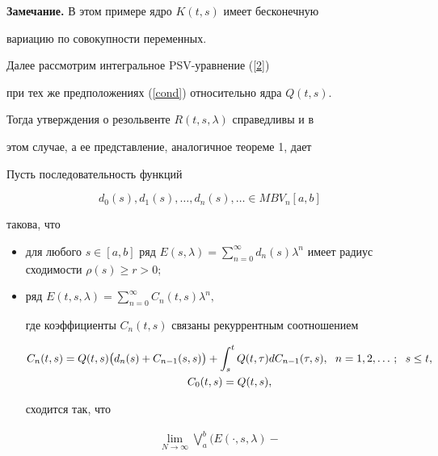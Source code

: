 {\bf Замечание.} В этом примере ядро $K(t,s)$ имеет бесконечную


вариацию по совокупности переменных.


\medskip





Далее рассмотрим интегральное PSV-уравнение (\ref{2})


при тех же предположениях (\ref{cond}) относительно ядра $Q(t,s).$


Тогда утверждения о резольвенте $R(t,s,\lambda)$ справедливы и в


этом случае, а ее представление, аналогичное теореме 1, дает





\begin{thm}


Пусть последовательность функций


$$


d_0(s),d_1(s),\dotsc,d_n(s),\dotsc\in MBV_n[a,b]


$$


такова, что


\begin{itemize}


\item[1)] для любого $s\in[a,b]$ ряд $E(s,\lambda)=\sum\limits_{n=0}^\infty


d_n(s)\lambda^n$ имеет радиус сходимости $\rho(s)\geq r>0;$


\item[2)] ряд $E(t,s,\lambda)=\sum\limits_{n=0}^\infty C_n(t,s)\lambda^n,$


где коэффициенты $C_n(t,s)$ связаны рекуррентным соотношением


\begin{gather*}\label{f12}


C_n(t,s)=Q(t,s)\big(d_n(s)+C_{n-1}(s,s)\big)+\integral{s}{t}


Q(t,\tau)dC_{n-1}(\tau,s),\ \; n=1,2,\dotsc;\ \; s\leq t, \\


%


C_0(t,s)=Q(t,s),


\end{gather*}


сходится так, что 


\begin{align*}\label{vlims}


\lim_{N\to\infty}\bigvee\limits_a^b\bigg(E(\cdot,s,\lambda)-



\end{align*}
\end{itemize}
\end{thm}
